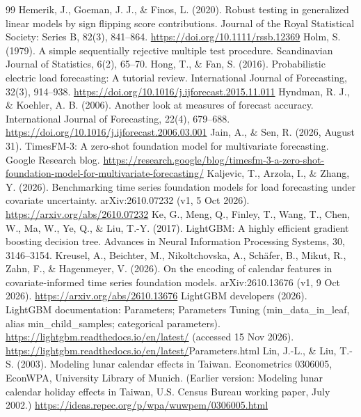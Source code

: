 \documentclass[review,12pt,authoryear]{elsarticle}
\begin{document}
\begin{thebibliography}{99}
Hemerik, J., Goeman, J. J., \& Finos, L. (2020). Robust testing in generalized linear models by sign flipping score contributions. Journal of the Royal Statistical Society: Series B, 82(3), 841–864. \url{https://doi.org/10.1111/rssb.12369}
Holm, S. (1979). A simple sequentially rejective multiple test procedure. Scandinavian Journal of Statistics, 6(2), 65–70.
Hong, T., \& Fan, S. (2016). Probabilistic electric load forecasting: A tutorial review. International Journal of Forecasting, 32(3), 914–938. \url{https://doi.org/10.1016/j.ijforecast.2015.11.011}
Hyndman, R. J., \& Koehler, A. B. (2006). Another look at measures of forecast accuracy. International Journal of Forecasting, 22(4), 679–688. \url{https://doi.org/10.1016/j.ijforecast.2006.03.001}
Jain, A., \& Sen, R. (2026, August 31). TimesFM-3: A zero-shot foundation model for multivariate forecasting. Google Research blog. \url{https://research.google/blog/timesfm-3-a-zero-shot-foundation-model-for-multivariate-forecasting/}
Kaljevic, T., Arzola, I., \& Zhang, Y. (2026). Benchmarking time series foundation models for load forecasting under covariate uncertainty. arXiv:2610.07232 (v1, 5 Oct 2026). \url{https://arxiv.org/abs/2610.07232}
Ke, G., Meng, Q., Finley, T., Wang, T., Chen, W., Ma, W., Ye, Q., \& Liu, T.-Y. (2017). LightGBM: A highly efficient gradient boosting decision tree. Advances in Neural Information Processing Systems, 30, 3146–3154.
Kreusel, A., Beichter, M., Nikoltchovska, A., Schäfer, B., Mikut, R., Zahn, F., \& Hagenmeyer, V. (2026). On the encoding of calendar features in covariate-informed time series foundation models. arXiv:2610.13676 (v1, 9 Oct 2026). \url{https://arxiv.org/abs/2610.13676}
LightGBM developers (2026). LightGBM documentation: Parameters; Parameters Tuning (min\_data\_in\_leaf, alias min\_child\_samples; categorical parameters). \url{https://lightgbm.readthedocs.io/en/latest/} (accessed 15 Nov 2026). \url{https://lightgbm.readthedocs.io/en/latest/}Parameters.html
Lin, J.-L., \& Liu, T.-S. (2003). Modeling lunar calendar effects in Taiwan. Econometrics 0306005, EconWPA, University Library of Munich. (Earlier version: Modeling lunar calendar holiday effects in Taiwan, U.S. Census Bureau working paper, July 2002.) \url{https://ideas.repec.org/p/wpa/wuwpem/0306005.html}

\end{thebibliography}
\end{document}
